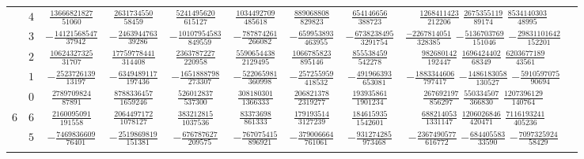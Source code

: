 \begin{table}
\begin{center}
\begin{tabular}{cccccccccc}
           &  $4$  &  $ \frac{ 13666821827}{  51060}$  &  $ \frac{  2631734550}{  58459}$  &  $ \frac{ 5241495620}{  615127}$  &  $ \frac{1034492709}{  485618}$  &  $ \frac{ 889068808}{  829823}$  &  $ \frac{ 654146656}{  388723}$  &  $ \frac{ 1268411423}{  212206}$  $ \frac{  2675355119}{  89174}$  $ \frac{  8534140303}{  48995}$  \\ \addlinespace
           &  $3$  &  $-\frac{ 14121568547}{  37942}$  &  $-\frac{  2463944763}{  39286}$  &  $-\frac{10107954583}{  849559}$  &  $-\frac{ 787874261}{  266082}$  &  $-\frac{ 659953893}{  463955}$  &  $-\frac{6738238495}{ 3291754}$  &  $ \frac{-2267814051}{  328385}$  $-\frac{  5136703769}{ 151046}$  $-\frac{ 29831101642}{ 152201}$  \\ \addlinespace
           &  $2$  &  $ \frac{ 10624327325}{  31707}$  &  $ \frac{ 17759778441}{ 314408}$  &  $ \frac{ 2363787227}{  220958}$  &  $ \frac{5590654438}{ 2129495}$  &  $ \frac{1066785823}{  895146}$  &  $ \frac{ 855538459}{  542278}$  &  $ \frac{  982680142}{  192447}$  $ \frac{  1696424402}{  68349}$  $ \frac{  6203677189}{  43561}$  \\ \addlinespace
           &  $1$  &  $-\frac{  2523726139}{  13197}$  &  $-\frac{  6349489117}{ 197436}$  &  $-\frac{ 1651888798}{  273307}$  &  $-\frac{ 522065981}{  360998}$  &  $-\frac{ 257255959}{  418532}$  &  $-\frac{ 491966393}{  653081}$  &  $-\frac{ 1883344606}{  797417}$  $-\frac{  1486183058}{ 130527}$  $-\frac{  5910597075}{  90694}$  \\ \addlinespace
           &  $0$  &  $ \frac{  2789709824}{  87891}$  &  $ \frac{  8788336457}{1659246}$  &  $ \frac{  526012837}{  537300}$  &  $ \frac{ 308180301}{ 1366333}$  &  $ \frac{ 206821378}{ 2319277}$  &  $ \frac{ 193935861}{ 1901234}$  &  $ \frac{  267692197}{  856297}$  $ \frac{   550334507}{ 366830}$  $ \frac{  1207396129}{ 140764}$  \\ \addlinespace
      $6$  &  $6$  &  $ \frac{  2160095091}{ 191558}$  &  $ \frac{  2064497172}{1078127}$  &  $ \frac{  383212815}{ 1037536}$  &  $ \frac{  83373698}{  861333}$  &  $ \frac{ 179193514}{ 3127239}$  &  $ \frac{ 184615935}{ 1542601}$  &  $ \frac{  688214053}{ 1331147}$  $ \frac{  1206026846}{ 420471}$  $ \frac{  7116193241}{ 405236}$  \\ \addlinespace
           &  $5$  &  $-\frac{  7469836609}{  76401}$  &  $-\frac{  2519869819}{ 151381}$  &  $-\frac{  676787627}{  209575}$  &  $-\frac{ 767075415}{  896921}$  &  $-\frac{ 379006664}{  761061}$  &  $-\frac{ 931274285}{  973468}$  &  $-\frac{ 2367490577}{  616772}$  $-\frac{   684405583}{  33590}$  $-\frac{  7097325924}{  58429}$  \\ \addlinespace

\end{tabular}
\end{center}
\end{table}
